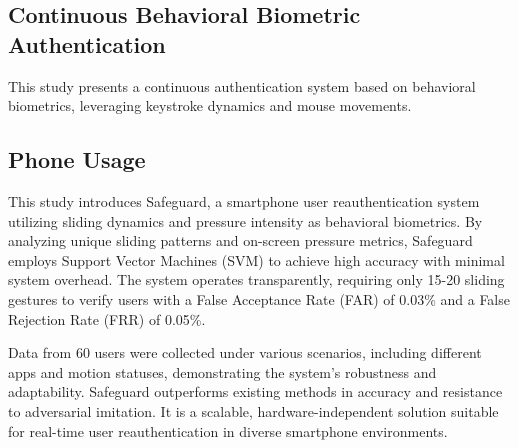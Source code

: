 \subsection{Continuous Behavioral Biometric Authentication}
\label{subsec:continuous-behavioral-biometric-authentication}

\parencite{4_Continuous_Authentication}
This study presents a continuous authentication system based on behavioral biometrics, leveraging keystroke dynamics and mouse movements. 


\subsection{Phone Usage}

\parencite{17_Phone} This study introduces Safeguard, a smartphone user reauthentication system utilizing sliding dynamics and pressure intensity as behavioral biometrics. By analyzing unique sliding patterns and on-screen pressure metrics, Safeguard employs Support Vector Machines (SVM) to achieve high accuracy with minimal system overhead. The system operates transparently, requiring only 15-20 sliding gestures to verify users with a False Acceptance Rate (FAR) of 0.03\% and a False Rejection Rate (FRR) of 0.05\%.

Data from 60 users were collected under various scenarios, including different apps and motion statuses, demonstrating the system's robustness and adaptability. Safeguard outperforms existing methods in accuracy and resistance to adversarial imitation. It is a scalable, hardware-independent solution suitable for real-time user reauthentication in diverse smartphone environments.
